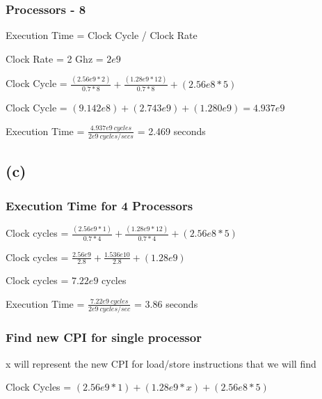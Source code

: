 \documentclass{article}
\begin{document}
    \subsubsection*{Processors - 8}

    Execution Time = Clock Cycle / Clock Rate

    Clock Rate = 2 Ghz = $2e9$
    \vspace*{6pt}

    Clock Cycle = $\frac{(2.56e9 * 2)}{0.7 * 8} + \frac{(1.28e9 * 12)}{0.7 * 8} + (2.56e8 * 5)$
    \vspace*{6pt}

    Clock Cycle = $(9.142e8) + (2.743e9) + (1.280e9) = 4.937e9$
    \vspace*{6pt}

    Execution Time = $\frac{4.937e9\ cycles}{2e9\ cycles/secs}$ = 2.469 seconds

    \subsection*{(c)}

    \subsubsection*{Execution Time for 4 Processors}

    Clock cycles = $\frac{(2.56e9 * 1)}{0.7 * 4} + \frac{(1.28e9 * 12)}{0.7*4} + (2.56e8 * 5)$

    \vspace*{6pt}

    Clock cycles = $\frac{2.56e9}{2.8} + \frac{1.536e{10}}{2.8} + (1.28e9) $
    
    \vspace*{6pt}

    Clock cycles = $7.22e9$ cycles
    \vspace*{6pt}
    
    Execution Time = $\frac{7.22e9\ cycles}{2e9\ cycles/sec}$ = 3.86 seconds

    \subsubsection*{Find new CPI for single processor}

    x will represent the new CPI for load/store instructions that we will find

    Clock Cycles = $(2.56e9 * 1) + (1.28e9 * x) + (2.56e8 * 5)$
\end{document}
